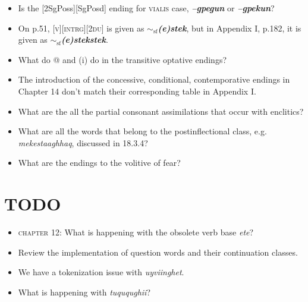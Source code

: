 \documentclass{article}
\begin{document}
\begin{itemize}

\item Is the [2SgPoss][SgPosd] ending for \textsc{vialis} case, \textit{\textbf{--gpegun}} or \textit{\textbf{--gpekun}}?

\item On p.51, \textsc{[v][intrg][2du]} is given as \textit{\textbf{$\sim_\text{sf}$(e)stek}}, but in Appendix I, p.182, it is given as \textit{\textbf{$\sim_\text{sf}$(e)stekstek}}.

\item What do @ and (i) do in the transitive optative endings?

\item The introduction of the concessive, conditional, contemporative endings in Chapter 14 don't match their corresponding table in Appendix I.

\item What are the all the partial consonant assimilations that occur with enclitics?

\item What are all the words that belong to the postinflectional class, e.g. \textit{mekestaaghhaq}, discussed in 18.3.4?

\item What are the endings to the volitive of fear?

\end{itemize}


\section{TODO}

\begin{itemize}
\renewcommand\labelitemi{$\cdot$}

\item \textsc{chapter 12}: What is happening with the obsolete verb base \textit{ete}?

\item Review the implementation of question words and their continuation classes.

\item We have a tokenization issue with \textit{uyviinghet}.

\item What is happening with \textit{tuququghii}?

\end{itemize}
\end{document}
